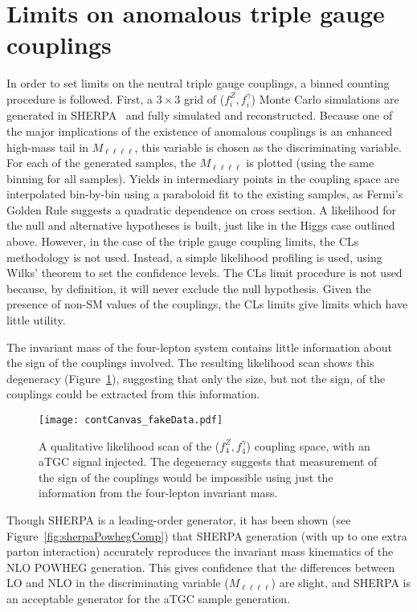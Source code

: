 \section{Limits on anomalous triple gauge couplings}
In order to set limits on the neutral triple gauge couplings, a binned counting
procedure is followed. First, a $3\times3$ grid of ($f_i^Z, f_i^\gamma$) Monte
Carlo simulations are generated in SHERPA~\cite{SHERPA} and fully simulated and
reconstructed. Because one of the major implications of the existence of
anomalous couplings is an enhanced high-mass tail in $M_{\ell \ell\ell\ell}$,
this variable is chosen as the discriminating variable. For each of the
generated samples, the $M_{\ell\ell\ell\ell}$ is plotted (using the same binning
for all samples). Yields in intermediary points in the coupling space are
interpolated bin-by-bin using a paraboloid fit to the existing samples, as
Fermi's Golden Rule suggests a quadratic dependence on cross section. A
likelihood for the null and alternative hypotheses is built, just like in the
Higgs case outlined above. However, in the case of the triple gauge coupling
limits, the CLs methodology is not used. Instead, a simple likelihood profiling
is used, using Wilks' theorem to set the confidence levels. The CLs limit %
procedure is not used because, by definition, it will never exclude the null
hypothesis. Given the presence of non-SM values of the couplings, the CLs limits
give limits which have little utility.

The invariant mass of the four-lepton system contains little information about
the sign of the couplings involved. The resulting likelihood scan shows this
degeneracy (Figure~\ref{fig:atgc_likelihood}), suggesting that only the size, but
not the sign, of the couplings could be extracted from this information.

\begin{figure}[h]
\centering
\texttt{[image: contCanvas\_fakeData.pdf]}
\caption[Qualitative likelihood scan of the ($f_4^Z, f_4^{\gamma}$) coupling
space, with a signal injected.]{A qualitative
likelihood scan of the ($f_4^Z, f_4^\gamma$) coupling space, with an aTGC signal
injected. The degeneracy suggests that measurement of the sign of the couplings
would be impossible using just the information from the four-lepton invariant
mass.}
\label{fig:atgc_likelihood}
\end{figure}

Though SHERPA is a leading-order generator, it has been shown (see
Figure~\ref{fig:sherpaPowhegComp}) that SHERPA generation (with up to one extra
parton interaction) accurately reproduces the invariant mass kinematics of the
NLO POWHEG generation. This gives confidence that the differences between LO and
NLO in the discriminating variable ($M_{\ell\ell\ell\ell}$) are slight, and
SHERPA is an acceptable generator for the aTGC sample generation.

